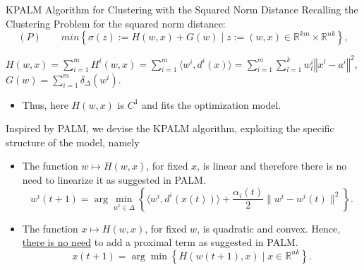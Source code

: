 \documentclass[9pt,handout]{beamer} %
\newcommand{\R}{\mathbb{R}} %
\newcommand{\norm}[1]{\left\Vert {#1} \right\Vert} %
\begin{document}
	\begin{frame}{KPALM Algorithm for Clustering with the Squared Norm Distance}
	Recalling the Clustering Problem for the squared norm distance:
		\begin{equation*}
				(P) \qquad min \left\lbrace \sigma(z) := H(w,x) + G(w) \mid z := (w,x) \in \R^{km} \times \R^{nk} \right\rbrace, 
		\end{equation*}
		\begin{center}
		$H(w,x) = \sum\limits_{i=1}^{m} H^i(w,x) = \sum\limits_{i=1}^{m} \langle w^i , d^i(x) \rangle = \sum\limits_{i=1}^m\sum\limits_{l=1}^k w^i_l \norm{x^l - a^i}^2$, $G(w) = \sum\limits_{i=1}^{m} \delta_{\Delta}(w^i)$.\\
		\end{center}
		\begin{itemize}[<+->]
	    	\item Thus, here $H(w,x)$ is $C^1$ and fits the optimization model.
    	\end{itemize}
		Inspired by PALM, we devise the KPALM algorithm, exploiting the specific structure of the model, namely
		\pause
		\begin{itemize}[<+->]
	    	\item The function $w \mapsto H(w,x)$, for fixed $x$, is linear and therefore there is no need to linearize it as suggested in PALM.
	    	\begin{equation*}
				w^i(t+1) = \arg\!\min\limits_{w^i \in \Delta} \left\lbrace \langle w^i , d^i(x(t)) \rangle + \frac{\alpha_i(t)}{2} \|w^i - w^i(t)\|^2 \right\rbrace. \label{W_update_step}
			\end{equation*}
	    	\item The function $x \mapsto H(w,x)$, for fixed $w$, is quadratic and convex. Hence, \underline{there is no need} to add a proximal term as suggested in PALM.
	    	\begin{equation*}
				x(t+1) = \arg\!\min \left\lbrace H(w(t+1), x) \mid x \in \mathbb{R}^{nk} \right\rbrace. \label{X_update_step}
			\end{equation*}
	    \end{itemize}
	\end{frame}
	
\end{document}
